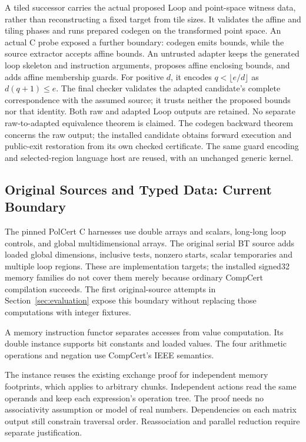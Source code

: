 A tiled successor carries the actual proposed Loop and point-space witness
data, rather than reconstructing a fixed target from tile sizes. It validates
the affine and tiling phases and runs prepared codegen on the transformed
point space. An actual C probe exposed a further boundary: codegen emits
 bounds, while the source extractor accepts affine bounds.
An untrusted adapter keeps the generated loop skeleton and instruction arguments,
proposes affine enclosing bounds, and adds affine membership guards. For positive
$d$, it encodes $q<\lfloor e/d\rfloor$ as $d(q+1)\leq e$.
The final checker validates the adapted candidate's complete correspondence with
the assumed source; it trusts neither the proposed bounds nor that identity.
Both raw and adapted Loop outputs are retained. No separate raw-to-adapted
equivalence theorem is claimed. The codegen backward theorem concerns the raw
output; the installed candidate obtains forward execution and public-exit
restoration from its own checked certificate. The same guard encoding and
selected-region language host are reused, with an unchanged generic kernel.

\subsection{Original Sources and Typed Data: Current Boundary}
\label{sec:original-source-boundary}

The pinned PolCert C harnesses use double arrays and scalars, long-long loop
controls, and global multidimensional arrays. The original serial BT source
adds loaded global dimensions, inclusive tests, nonzero starts, scalar
temporaries and multiple loop regions. These are implementation targets; the
installed signed32 memory families do not cover them merely because ordinary
CompCert compilation succeeds. The first original-source attempts in
Section~\ref{sec:evaluation} expose this boundary without replacing those
computations with integer fixtures.

A memory instruction functor separates accesses from value computation.
Its double instance supports bit constants and loaded values. The four
arithmetic operations and negation use CompCert's IEEE semantics.

The instance reuses the existing exchange proof for independent memory
footprints, which applies to arbitrary chunks. Independent actions read the
same operands and keep each expression's operation tree. The proof needs no
associativity assumption or model of real numbers. Dependencies on each
matrix output still constrain traversal order. Reassociation and parallel
reduction require separate justification.

